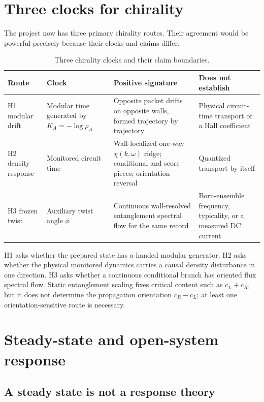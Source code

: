 \documentclass[aps,prb,onecolumn,nofootinbib,superscriptaddress]{revtex4-2}
\begin{document}
\section{Three clocks for chirality}
\label{sec:three-clocks}

The project now has three primary chirality routes.  Their agreement would be
powerful precisely because their clocks and claims differ.

\begin{table}[t]
\caption{Three chirality clocks and their claim boundaries.}
\label{tab:three-clocks}
\small
\begin{tabularx}{\textwidth}{@{}L{0.12\textwidth}L{0.18\textwidth}L{0.27\textwidth}Y@{}}
\toprule
Route & Clock & Positive signature & Does not establish \\
\midrule
H1 modular drift & Modular time generated by $K_A=-\log\rho_A$ & Opposite
packet drifts on opposite walls, formed trajectory by trajectory & Physical
circuit-time transport or a Hall coefficient \\
H2 density response & Monitored circuit time & Wall-localized one-way
$\chi(k,\omega)$ ridge; conditional and score pieces; orientation reversal &
Quantized transport by itself \\
H3 frozen twist & Auxiliary twist angle $\phi$ & Continuous wall-resolved
entanglement spectral flow for the same record & Born-ensemble frequency,
typicality, or a measured DC current \\
\bottomrule
\end{tabularx}
\end{table}

H1 asks whether the prepared state has a handed modular generator.  H2 asks
whether the physical monitored dynamics carries a causal density disturbance
in one direction.  H3 asks whether a continuous conditional branch has
oriented flux spectral flow.  Static entanglement scaling fixes critical
content such as $c_L+c_R$, but it does not determine the propagation
orientation $c_R-c_L$; at least one orientation-sensitive route is necessary.

\section{Steady-state and open-system response}
\label{sec:open-response}

\subsection{A steady state is not a response theory}
\end{document}
